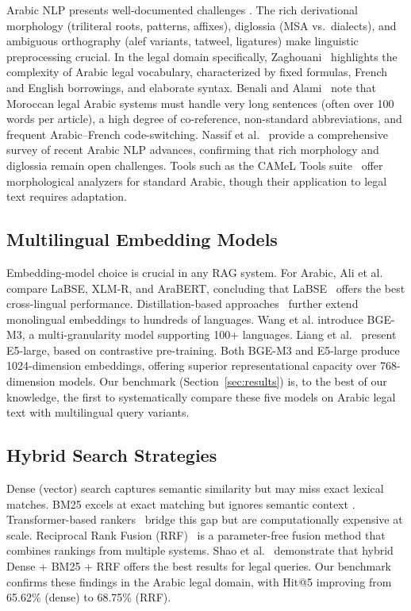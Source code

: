 Arabic NLP presents well-documented challenges \cite{habash2010arabic}. The
rich derivational morphology (triliteral roots, patterns, affixes), diglossia
(MSA vs.\ dialects), and ambiguous orthography (alef variants, tatweel,
ligatures) make linguistic preprocessing crucial. In the legal domain
specifically, Zaghouani~\cite{zaghouani2021arabic} highlights the complexity
of Arabic legal vocabulary, characterized by fixed formulas, French and
English borrowings, and elaborate syntax. Benali and
Alami~\cite{benali2025moroccan} note that Moroccan legal Arabic systems must
handle very long sentences (often over 100 words per article), a high degree
of co-reference, non-standard abbreviations, and frequent Arabic--French
code-switching. Nassif et al.~\cite{nassif2024arabic} provide a comprehensive
survey of recent Arabic NLP advances, confirming that rich morphology and
diglossia remain open challenges. Tools such as the CAMeL Tools
suite~\cite{obaraj2021cameltools} offer morphological analyzers for standard
Arabic, though their application to legal text requires adaptation.

\subsection{Multilingual Embedding Models}

Embedding-model choice is crucial in any RAG system. For Arabic,
Ali et al.~\cite{ali2022arabic} compare LaBSE, XLM-R, and AraBERT, concluding
that LaBSE~\cite{feng2022labse} offers the best cross-lingual performance.
Distillation-based approaches~\cite{reimers2020multilingual} further extend
monolingual embeddings to hundreds of languages. Wang et al.%
\cite{wang2023bge} introduce BGE-M3, a multi-granularity model supporting
100+ languages. Liang et al.~\cite{liang2023multilingual} present E5-large,
based on contrastive pre-training. Both BGE-M3 and E5-large produce
1024-dimension embeddings, offering superior representational capacity over
768-dimension models. Our benchmark (Section~\ref{sec:results}) is, to the
best of our knowledge, the first to systematically compare these five models
on Arabic legal text with multilingual query variants.

\subsection{Hybrid Search Strategies}

Dense (vector) search captures semantic similarity but may miss exact lexical
matches. BM25 excels at exact matching but ignores semantic context
\cite{robertson2009bm25}. Transformer-based rankers~\cite{lin2021hybrid}
bridge this gap but are computationally expensive at scale. Reciprocal Rank
Fusion (RRF)~\cite{cormack2009reciprocal}
is a parameter-free fusion method that combines rankings from multiple
systems. Shao et al.~\cite{shao2023hybrid} demonstrate that hybrid
Dense + BM25 + RRF offers the best results for legal queries. Our benchmark
confirms these findings in the Arabic legal domain, with Hit@5 improving from
65.62\% (dense) to 68.75\% (RRF).

